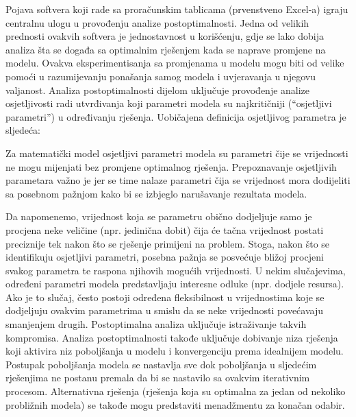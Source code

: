 \documentclass[a4paper, utf8, 11pt, colorlinks]{article}
\begin{document}
Pojava softvera koji rade sa proračunskim tablicama (prvenstveno Excel-a) igraju centralnu ulogu u provođenju analize postoptimalnosti. Jedna od velikih prednosti ovakvih softvera je jednostavnost u korišćenju, gdje se lako dobija analiza šta se događa sa optimalnim rješenjem kada se naprave promjene na modelu.  Ovakva eksperimentisanja sa promjenama u modelu mogu biti od velike pomoći u razumijevanju ponašanja samog modela i uvjeravanja u njegovu valjanost.  Analiza postoptimalnosti dijelom  uključuje provođenje analize osjetljivosti radi utvrđivanja koji parametri modela su najkritičniji (``osjetljivi parametri'') u određivanju rješenja. Uobičajena definicija osjetljivog parametra je sljedeća:

Za matematički model osjetljivi parametri modela su parametri čije se vrijednosti ne mogu mijenjati bez promjene optimalnog rješenja. Prepoznavanje osjetljivih parametara važno je jer se time nalaze parametri čija se vrijednost mora dodijeliti sa posebnom pažnjom kako bi se izbjeglo narušavanje rezultata modela.

Da napomenemo, vrijednost koja se parametru obično dodjeljuje samo je procjena neke veličine
(npr. jedinična dobit) čija će tačna vrijednost postati preciznije tek nakon što se rješenje primijeni na problem. Stoga, nakon
što se identifikuju osjetljivi parametri, posebna pažnja se posvećuje bližoj procjeni svakog parametra te  raspona njihovih mogućih vrijednosti.  U nekim slučajevima, određeni parametri modela predstavljaju interesne odluke (npr. dodjele resursa). Ako je to slučaj, često postoji određena fleksibilnost u vrijednostima koje se dodjeljuju ovakvim parametrima u smislu da se neke vrijednosti povećavaju  smanjenjem drugih. Postoptimalna analiza uključuje istraživanje takvih kompromisa. Analiza postoptimalnosti takođe uključuje dobivanje niza rješenja koji aktivira niz poboljšanja u modelu i konvergenciju prema idealnijem modelu. Postupak poboljšanja modela se nastavlja sve dok    poboljšanja u sljedećim rješenjima ne postanu premala da bi se nastavilo sa ovakvim iterativnim procesom.   Alternativna rješenja (rješenja koja su optimalna za jedan od nekoliko probližnih modela) se takođe mogu predstaviti menadžmentu za konačan odabir. 

\end{document}
